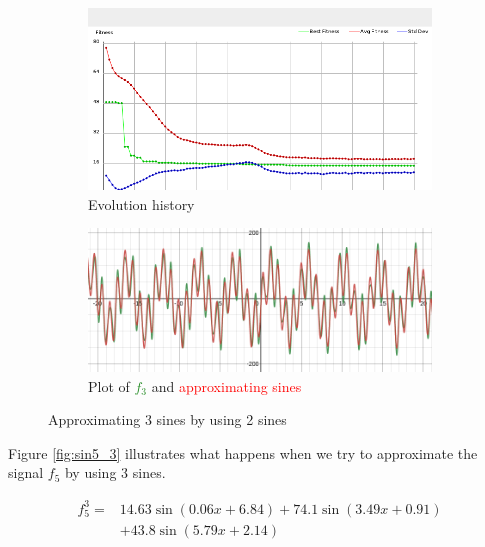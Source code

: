 \documentclass[conference]{IEEEtran}
\begin{document}
\begin{figure}[h]
\centering
\begin{subfigure}{.8\linewidth}
  \centering
  \includegraphics[width=.9\linewidth]{img/sin3_2.png}
  \caption{Evolution history}
  \label{fig:hist_sin3_2}

\end{subfigure}
\begin{subfigure}{.8\linewidth}
  \centering
  \includegraphics[width=.9\linewidth]{img/plot_sin3_2.png}
  \caption{Plot of \textcolor{ForestGreen}{$f_3$} and \textcolor{red}{approximating sines}}
  \label{fig:plot_sin3_2}
\end{subfigure}
\caption{Approximating 3 sines by using 2 sines}
\label{fig:sin3_2}
\end{figure}

Figure \ref{fig:sin5_3} illustrates what happens when we try to approximate the signal $f_5$ by using 3 sines.

\begin{equation}
	\begin{split}
		f_5^3 =& 14.63\sin(0.06x+6.84) + 74.1\sin(3.49x+0.91) \\
			&+ 43.8\sin(5.79x+2.14)
	\end{split}
	\label{eq:f5_3}
\end{equation}
\end{document}
